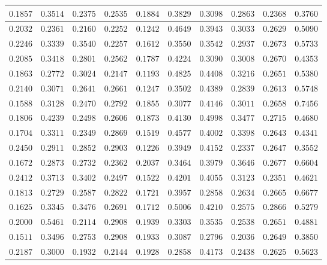 \begin{longtable}{c|c|c|c|c|c|c|c|c|c}
$0.1857$ & $0.3514$ & $0.2375$ & $0.2535$ & $0.1884$ & $0.3829$ & $0.3098$ & $0.2863$ & $0.2368$ & $0.3760$ \\ \hline
$0.2032$ & $0.2361$ & $0.2160$ & $0.2252$ & $0.1242$ & $0.4649$ & $0.3943$ & $0.3033$ & $0.2629$ & $0.5090$ \\ \hline
$0.2246$ & $0.3339$ & $0.3540$ & $0.2257$ & $0.1612$ & $0.3550$ & $0.3542$ & $0.2937$ & $0.2673$ & $0.5733$ \\ \hline
$0.2085$ & $0.3418$ & $0.2801$ & $0.2562$ & $0.1787$ & $0.4224$ & $0.3090$ & $0.3008$ & $0.2670$ & $0.4353$ \\ \hline
$0.1863$ & $0.2772$ & $0.3024$ & $0.2147$ & $0.1193$ & $0.4825$ & $0.4408$ & $0.3216$ & $0.2651$ & $0.5380$ \\ \hline
$0.2140$ & $0.3071$ & $0.2641$ & $0.2661$ & $0.1247$ & $0.3502$ & $0.4389$ & $0.2839$ & $0.2613$ & $0.5748$ \\ \hline
$0.1588$ & $0.3128$ & $0.2470$ & $0.2792$ & $0.1855$ & $0.3077$ & $0.4146$ & $0.3011$ & $0.2658$ & $0.7456$ \\ \hline
$0.1806$ & $0.4239$ & $0.2498$ & $0.2606$ & $0.1873$ & $0.4130$ & $0.4998$ & $0.3477$ & $0.2715$ & $0.4680$ \\ \hline
$0.1704$ & $0.3311$ & $0.2349$ & $0.2869$ & $0.1519$ & $0.4577$ & $0.4002$ & $0.3398$ & $0.2643$ & $0.4341$ \\ \hline
$0.2450$ & $0.2911$ & $0.2852$ & $0.2903$ & $0.1226$ & $0.3949$ & $0.4152$ & $0.2337$ & $0.2647$ & $0.3552$ \\ \hline
$0.1672$ & $0.2873$ & $0.2732$ & $0.2362$ & $0.2037$ & $0.3464$ & $0.3979$ & $0.3646$ & $0.2677$ & $0.6604$ \\ \hline
$0.2412$ & $0.3713$ & $0.3402$ & $0.2497$ & $0.1522$ & $0.4201$ & $0.4055$ & $0.3123$ & $0.2351$ & $0.4621$ \\ \hline
$0.1813$ & $0.2729$ & $0.2587$ & $0.2822$ & $0.1721$ & $0.3957$ & $0.2858$ & $0.2634$ & $0.2665$ & $0.6677$ \\ \hline
$0.1625$ & $0.3345$ & $0.3476$ & $0.2691$ & $0.1712$ & $0.5006$ & $0.4210$ & $0.2575$ & $0.2866$ & $0.5279$ \\ \hline
$0.2000$ & $0.5461$ & $0.2114$ & $0.2908$ & $0.1939$ & $0.3303$ & $0.3535$ & $0.2538$ & $0.2651$ & $0.4881$ \\ \hline
$0.1511$ & $0.3496$ & $0.2753$ & $0.2908$ & $0.1933$ & $0.3087$ & $0.2796$ & $0.2036$ & $0.2649$ & $0.3850$ \\ \hline
$0.2187$ & $0.3000$ & $0.1932$ & $0.2144$ & $0.1928$ & $0.2858$ & $0.4173$ & $0.2438$ & $0.2625$ & $0.5623$ \\ \hline

\end{longtable}
